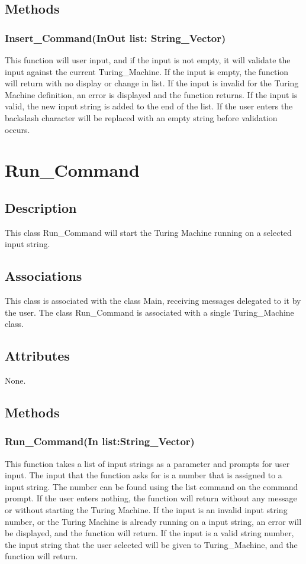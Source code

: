 \documentclass{report}
\begin{document}
    \subsection{Methods} 
    \subsubsection{Insert\_Command(InOut list: String\_Vector)}
    This function will user input, and if the input is not empty, it will validate the input against the current Turing\_Machine. If the input is empty, the function will return with no display or change in list. If the input is invalid for the Turing Machine definition, an error is displayed and the function returns. If the input is valid, the new input string is added to the end of the list. If the user enters the backslash character will be replaced with an empty string before validation occurs.
    
    
      \section{Run\_Command}
	\subsection{Description}
    
    This class Run\_Command will start the Turing Machine running on a selected input string. 
    
\subsection{Associations} 
This class is associated with the class Main, receiving messages delegated to it by the user.
     The class Run\_Command is associated with a single Turing\_Machine class.
    \subsection{Attributes}
    None.
    \subsection{Methods} 
    \subsubsection{Run\_Command(In list:String\_Vector)}
    This function takes a list of input strings as a parameter and prompts for user input. The input that the function asks for is a number that is assigned to a input string. The number can be found using the list command on the command prompt. If the user enters nothing, the function will return without any message or without starting the Turing Machine. If the input is an invalid input string number, or the Turing Machine is already running on a input string, an error will be displayed, and the function will return. If the input is a valid string number, the input string that the user selected will be given to Turing\_Machine, and the function will return.
    
\end{document}
